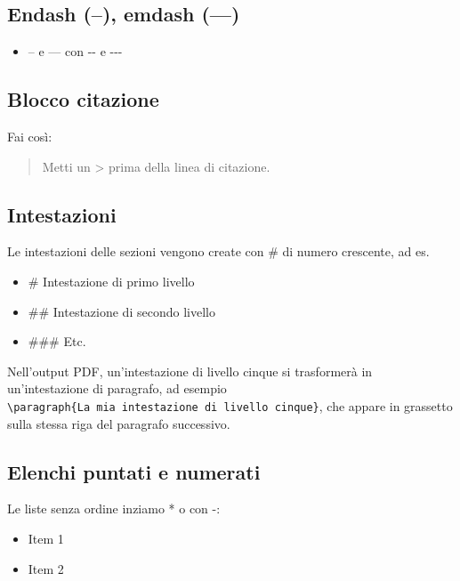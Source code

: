 \documentclass[a4paper, 11pt, nobind]{templates/ociamthesis}
\providecommand{\tightlist}{%
  \setlength{\itemsep}{0pt}\setlength{\parskip}{0pt}}
\begin{document}
\hypertarget{endash-emdash}{%
\subsection{Endash (--), emdash (---)}\label{endash-emdash}}

\begin{itemize}
\tightlist
\item
  -- e --- con -\/- e -\/-\/-
\end{itemize}

\hypertarget{blocco-citazione}{%
\subsection{Blocco citazione}\label{blocco-citazione}}

Fai così:

\begin{quote}
Metti un \textgreater{} prima della linea di citazione.
\end{quote}

\hypertarget{intestazioni}{%
\subsection{Intestazioni}\label{intestazioni}}

Le intestazioni delle sezioni vengono create con \# di numero crescente, ad es.

\begin{itemize}
\tightlist
\item
  \# Intestazione di primo livello
\item
  \#\# Intestazione di secondo livello
\item
  \#\#\# Etc.
\end{itemize}

Nell'output PDF, un'intestazione di livello cinque si trasformerà in un'intestazione di paragrafo, ad esempio \texttt{\textbackslash{}paragraph\{La\ mia\ intestazione\ di\ livello\ cinque\}}, che appare in grassetto sulla stessa riga del paragrafo successivo.

\hypertarget{elenchi-puntati-e-numerati}{%
\subsection{Elenchi puntati e numerati}\label{elenchi-puntati-e-numerati}}

Le liste senza ordine inziamo * o con -:

\begin{itemize}
\tightlist
\item
  Item 1
\item
  Item 2
\end{itemize}
\end{document}
